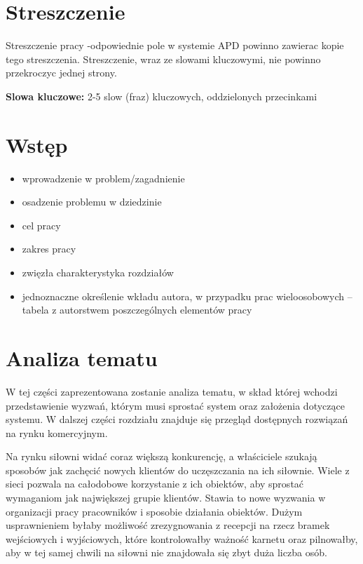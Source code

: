 \documentclass[a4paper,twoside,12pt]{book}
\newcounter{stronyPozaNumeracja}
\begin{document}
\setcounter{stronyPozaNumeracja}{\value{page}}
\mainmatter
\pagestyle{empty}

\chapter*{Streszczenie}

Streszczenie pracy -odpowiednie pole w systemie APD powinno zawierac kopie tego streszczenia. Streszczenie, wraz ze slowami kluczowymi, nie powinno przekroczyc jednej strony.

{\bf Slowa kluczowe:} 2-5 slow (fraz) kluczowych, oddzielonych przecinkami


\cleardoublepage

\pagestyle{NumeryStronNazwyRozdzialow}


\chapter{Wstęp}

\begin{itemize}
\item wprowadzenie w problem/zagadnienie
\item osadzenie problemu w dziedzinie
\item cel pracy
\item zakres pracy
\item zwięzła charakterystyka rozdziałów
\item jednoznaczne określenie wkładu autora, w przypadku prac wieloosobowych – tabela z autorstwem poszczególnych elementów pracy
\end{itemize}

\chapter{Analiza tematu}
W tej części zaprezentowana zostanie analiza tematu, w skład której wchodzi przedstawienie wyzwań, którym musi sprostać system oraz założenia dotyczące systemu. W dalszej części rozdziału znajduje się przegląd dostępnych rozwiązań na rynku komercyjnym.

Na rynku siłowni widać coraz większą konkurencję, a właściciele szukają sposobów jak zachęcić nowych klientów do uczęszczania na ich siłownie. Wiele z sieci pozwala na całodobowe korzystanie z ich obiektów, aby sprostać wymaganiom jak największej grupie klientów. Stawia to nowe wyzwania w organizacji pracy pracowników i sposobie działania obiektów. Dużym usprawnieniem byłaby możliwość zrezygnowania z recepcji na rzecz bramek wejściowych i wyjściowych, które kontrolowałby ważność karnetu oraz pilnowałby, aby w tej samej chwili na siłowni nie znajdowała się zbyt duża liczba osób.
\end{document}

